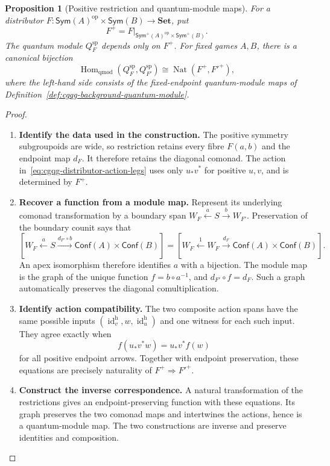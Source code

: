 \documentclass[oneside]{article}
\newcommand{\Conf}{\mathsf{Conf}}
\newcommand{\Sym}{\mathsf{Sym}}
\newcommand{\id}{\operatorname{id}}
\newcommand{\op}{\mathrm{op}}
\theoremstyle{plain}
\newtheorem{proposition}[theorem]{Proposition}
\theoremstyle{definition}
\theoremstyle{remark}
\begin{document}
\begin{proposition}[Positive restriction and quantum-module maps]
\label{prop:cgqg-positive-restriction}
For a distributor \(F:\Sym(A)^{\op}\times \Sym(B)\to\mathbf{Set}\), put
\[
 F^+=F\big|_{\Sym^+(A)^{\op}\times\Sym^+(B)}.
\]
The quantum module \(Q_F^{\mathrm{sp}}\) depends only on \(F^+\).
For fixed games \(A,B\), there is a canonical bijection
\begin{equation}
 \operatorname{Hom}_{\mathrm{qmod}}
   (Q_F^{\mathrm{sp}},Q_{F'}^{\mathrm{sp}})
 \cong\operatorname{Nat}(F^+,F'^+),
 \label{eq:cgqg-positive-restriction-module-maps}
\end{equation}
where the left-hand side consists of the fixed-endpoint quantum-module
maps of Definition~\ref{def:cgqg-background-quantum-module}.
\end{proposition}
\begin{proof}
    \leavevmode
    \begin{enumerate}[beginpenalty=10000]
        \item \textbf{Identify the data used in the construction.}
        The positive symmetry subgroupoids are wide, so restriction
        retains every fibre \(F(a,b)\) and the endpoint map \(d_F\).
        It therefore retains the diagonal comonad. The action
        in~\eqref{eq:cgqg-distributor-action-legs} uses only
        \(u_*v^*\) for positive \(u,v\), and is determined by \(F^+\).

        \item \textbf{Recover a function from a module map.}
        Represent its underlying comonad transformation by a boundary
        span \(W_F\xleftarrow{a}S\xrightarrow{b}W_{F'}\).
        Preservation of the boundary counit says that
        \[
         [W_F\xleftarrow{a}S\xrightarrow{d_{F'}\circ b}\Conf(A)\times \Conf(B)]
         =[W_F\xleftarrow{1}W_F\xrightarrow{d_F}\Conf(A)\times \Conf(B)].
        \]
        An apex isomorphism therefore identifies \(a\) with a
        bijection. The module map is the graph of the unique function
        \(f=b\circ a^{-1}\), and \(d_{F'}\circ f=d_F\). Such a graph
        automatically preserves the diagonal comultiplication.

        \item \textbf{Identify action compatibility.}
        The two composite action spans have the same possible inputs
        \((\id_v^{\mathrm h},w,\id_u^{\mathrm h})\) and one witness for each such input.
        They agree exactly when
        \[
          f(u_*v^*w)=u_*v^*f(w)
        \]
        for all positive endpoint arrows. Together with endpoint
        preservation, these equations are precisely naturality of
        \(F^+\Rightarrow F'^+\).

        \item \textbf{Construct the inverse correspondence.}
        A natural transformation of the restrictions gives an
        endpoint-preserving function with these equations. Its graph
        preserves the two comonad maps and intertwines the actions,
        hence is a quantum-module map. The two constructions are
        inverse and preserve identities and composition. \qedhere
    \end{enumerate}
\end{proof}
\end{document}
